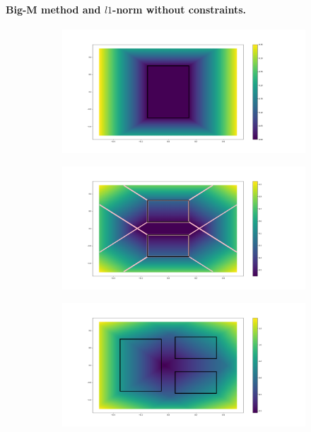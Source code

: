 \paragraph{Big-M method and $l1$-norm without constraints.}
\begin{figure}[ht]
    \centering
    \captionsetup[subfigure]{justification=centering}
    \begin{subfigure}[t]{0.48\linewidth}
    \includegraphics[trim={5cm 2cm 12cm 2cm},clip,width=\textwidth]{Figures/Chapter_MIP_SL1M/l1_no_cst/grad_simple_0.png}
    \end{subfigure}
    \begin{subfigure}[t]{0.48\linewidth}
    \includegraphics[trim={5cm 2cm 12cm 2cm},clip,width=\textwidth]{Figures/Chapter_MIP_SL1M/l1_no_cst/grad_two_0_1_limit.png}
    \end{subfigure}
    \begin{subfigure}[t]{0.48\linewidth}
    \includegraphics[trim={5cm 2cm 12cm 2cm},clip,width=\textwidth]{Figures/Chapter_MIP_SL1M/l1_no_cst/grad_three_0_1_2.png}

\end{subfigure}
\end{figure}
